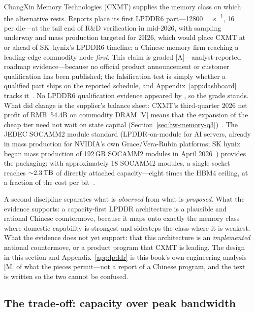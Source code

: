 ChangXin Memory Technologies (CXMT) supplies the memory class on which the alternative rests. Reports place its first LPDDR6 part---\SI{12800}{\mega\bit\per\second}, \SI{16}{\giga\bit} per die---at the tail end of R\&D verification in mid-2026, with sampling underway and mass production targeted for 2H26, which would place CXMT at or ahead of SK~hynix's LPDDR6 timeline: a Chinese memory firm reaching a leading-edge commodity node \emph{first}. This claim is graded [A]---analyst-reported roadmap evidence---because no official product announcement or customer qualification has been published; the falsification test is simply whether a qualified part ships on the reported schedule, and Appendix~\ref{app:dashboard} tracks it~\cite{cxmt-lpddr6}. No LPDDR6 qualification evidence appeared by \datafreeze, so the grade stands. What did change is the supplier's balance sheet: CXMT's third-quarter 2026 net profit of RMB~54.4B on commodity DRAM [V] means that the expansion of the cheap tier need not wait on state capital (Section~\ref{sec:hw-memory-q3})~\cite{hw-cxmt-q3}. The JEDEC SOCAMM2 module standard (LPDDR-on-module for AI servers, already in mass production for NVIDIA's own Grace/Vera-Rubin platforms; SK hynix began mass production of 192\,GB SOCAMM2 modules in April 2026~\cite{socamm2,skhynixSocamm}) provides the packaging: with approximately 18 SOCAMM2 modules, a single socket reaches ${\sim}\SI{2.3}{\tera\byte}$ of directly attached capacity---eight times the HBM4 ceiling, at a fraction of the cost per bit~\cite{riken-study}.

A second discipline separates what is \emph{observed} from what is \emph{proposed}. What the evidence supports: a capacity-first LPDDR architecture is a plausible and rational Chinese countermove, because it maps onto exactly the memory class where domestic capability is strongest and sidesteps the class where it is weakest. What the evidence does not yet support: that this architecture is an \emph{implemented} national countermove, or a product program that CXMT is leading. The design in this section and Appendix~\ref{app:lpddr} is this book's own engineering analysis [M] of what the pieces permit---not a report of a Chinese program, and the text is written so the two cannot be confused.

\subsection{The trade-off: capacity over peak bandwidth}


